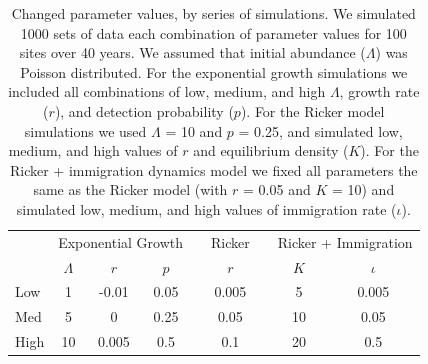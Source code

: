 \documentclass[12pt]{article}
\begin{document}


\begin{table}[t]
  \centering
  \caption{Changed parameter values, by series of simulations.  We
    simulated 1000 sets of data each combination of parameter values
    for 100 sites over 40 years.  We assumed that initial abundance
    ($\Lambda$) was Poisson distributed.  For the exponential growth
    simulations we included all combinations of low, medium, and high
    $\Lambda$, growth rate ($r$), and detection probability ($p$).  For the Ricker
    model simulations we used $\Lambda$ = 10 and $p$ = 0.25, and simulated low,
    medium, and high values of $r$ and equilibrium density ($K$).  For the
    Ricker + immigration dynamics model we fixed all parameters the
    same as the Ricker model (with $r$ = 0.05 and $K$ = 10) and simulated
    low, medium, and high values of immigration rate ($\iota$).}
  \begin{tabular}{lcccccccc}
    \hline
    & \multicolumn{3}{c}{Exponential Growth} && Ricker &&
    \multicolumn{2}{c}{Ricker + Immigration} \\
    \cline{2-4}     \cline{6-6}    \cline{8-9}
                & $\Lambda$ & $r$ & $p$ && $r$  && $K$ & $\iota$  \\
    \hline
    Low	        &1	&-0.01	&0.05	&&0.005	&&5	&0.005  \\
    Med	        &5	&0	&0.25	&&0.05	&&10	&0.05   \\
    High	&10	&0.005	&0.5	&&0.1	&&20	&0.5    \\
    \hline
  \end{tabular}
\end{table}

\vfill
\newpage
\end{document}
